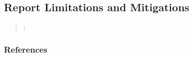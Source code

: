 



\subsection{Report Limitations and Mitigations}
\label{sec:report-limitations-and-mitigations}

\begin{quote}
\summary: 
\end{quote}



\subsubsection{References}





